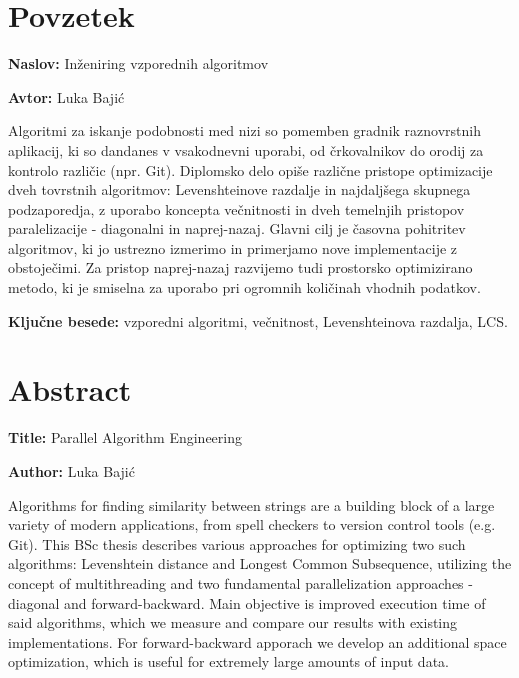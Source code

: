 \documentclass[a4paper,12pt,openright]{book}
\newcommand{\ttitle}{Inženiring vzporednih algoritmov}
\newcommand{\ttitleEn}{Parallel Algorithm Engineering}
\newcommand{\tauthor}{Luka Bajić}
\newcommand{\tkeywords}{vzporedni algoritmi, večnitnost, Levenshteinova razdalja, LCS}
\newcommand{\clearemptydoublepage}{\newpage{\pagestyle{empty}\cleardoublepage}}
\begin{document}
\clearemptydoublepage

{}
\chapter*{Povzetek}

\noindent\textbf{Naslov:} \ttitle
\bigskip

\noindent\textbf{Avtor:} \tauthor
\bigskip

\noindent Algoritmi za iskanje podobnosti med nizi so pomemben gradnik raznovrstnih aplikacij, ki so dandanes v vsakodnevni uporabi, od črkovalnikov do orodij za kontrolo različic (npr. Git). Diplomsko delo opiše različne pristope optimizacije dveh tovrstnih algoritmov: Levenshteinove razdalje in najdaljšega skupnega podzaporedja, z uporabo koncepta večnitnosti in dveh temelnjih pristopov paralelizacije - diagonalni in naprej-nazaj. Glavni cilj je časovna pohitritev algoritmov, ki jo ustrezno izmerimo in primerjamo nove implementacije z obstoječimi. Za pristop naprej-nazaj razvijemo tudi prostorsko optimizirano metodo, ki je smiselna za uporabo pri ogromnih količinah vhodnih podatkov. 

\bigskip

\noindent\textbf{Ključne besede:} \tkeywords.
\clearemptydoublepage

{}
\chapter*{Abstract}

\noindent\textbf{Title:} \ttitleEn
\bigskip

\noindent\textbf{Author:} \tauthor
\bigskip

\noindent Algorithms for finding similarity between strings are a building block of a large variety of modern applications, from spell checkers to version control tools (e.g. Git). This BSc thesis describes various approaches for optimizing two such algorithms: Levenshtein distance and Longest Common Subsequence, utilizing the concept of multithreading and two fundamental parallelization approaches - diagonal and forward-backward. Main objective is improved execution time of said algorithms, which we measure and compare our results with existing implementations. For forward-backward apporach we develop an additional space optimization, which is useful for extremely large amounts of input data.
\end{document}

